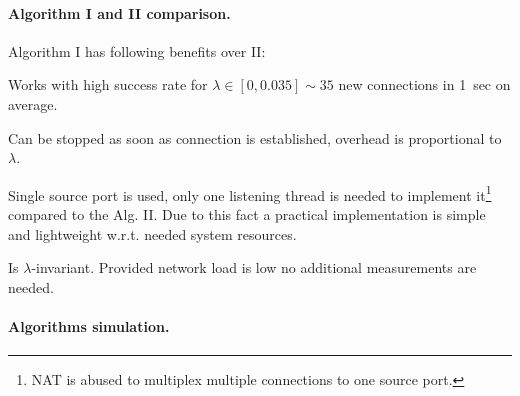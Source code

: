 \documentclass[twoside]{article}
\begin{document}
\begin{multicols}{2}
\paragraph{Algorithm I and II comparison.} 
Algorithm I has following benefits over II:
\begin{compactitem}
 \item Works with high success rate for $\lambda \in [0, 0.035] \sim 35$ new connections in 1~sec on average.
 \item Can be stopped as soon as connection is established, overhead is proportional to~$\lambda$.
 \item Single source port is used, only one listening thread is needed to implement
it\footnote{NAT is abused to multiplex multiple connections to one source port.} compared to the Alg. II.
Due to this fact a practical implementation is simple and lightweight w.r.t. needed system resources.
 \item Is $\lambda$-invariant. Provided network load is low no additional measurements are needed.
\end{compactitem}

\paragraph{Algorithms simulation.}


\end{multicols}
\end{document}
